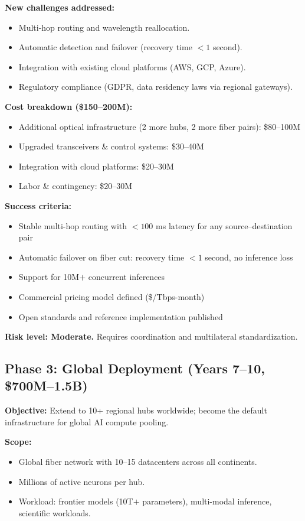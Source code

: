 \documentclass[12pt]{article}
\begin{document}
\textbf{New challenges addressed:}
\begin{itemize}[leftmargin=1.6em,itemsep=2pt]
  \item Multi-hop routing and wavelength reallocation.
  \item Automatic detection and failover (recovery time $<1$ second).
  \item Integration with existing cloud platforms (AWS, GCP, Azure).
  \item Regulatory compliance (GDPR, data residency laws via regional gateways).
\end{itemize}

\textbf{Cost breakdown (\$150--200M):}
\begin{itemize}[leftmargin=1.6em,itemsep=2pt]
  \item Additional optical infrastructure (2 more hubs, 2 more fiber pairs): \$80--100M
  \item Upgraded transceivers \& control systems: \$30--40M
  \item Integration with cloud platforms: \$20--30M
  \item Labor \& contingency: \$20--30M
\end{itemize}

\textbf{Success criteria:}
\begin{itemize}[leftmargin=1.6em,itemsep=2pt]
  \item Stable multi-hop routing with $<100$ ms latency for any source--destination pair
  \item Automatic failover on fiber cut: recovery time $<1$ second, no inference loss
  \item Support for 10M$+$ concurrent inferences
  \item Commercial pricing model defined (\$/Tbps-month)
  \item Open standards and reference implementation published
\end{itemize}

\textbf{Risk level: Moderate.} Requires coordination and multilateral standardization.

\subsection{Phase 3: Global Deployment (Years 7--10, \$700M--1.5B)}

\textbf{Objective:} Extend to 10+ regional hubs worldwide; become the default
infrastructure for global AI compute pooling.

\textbf{Scope:}
\begin{itemize}[leftmargin=1.6em,itemsep=2pt]
  \item Global fiber network with 10--15 datacenters across all continents.
  \item Millions of active neurons per hub.
  \item Workload: frontier models (10T$+$ parameters), multi-modal inference,
  scientific workloads.
\end{itemize}
\end{document}
